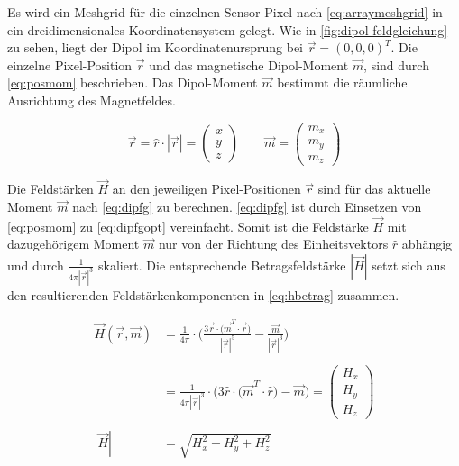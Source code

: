 \clearpage


Es wird ein Meshgrid für die einzelnen Sensor-Pixel nach \autoref{eq:arraymeshgrid} in ein dreidimensionales Koordinatensystem gelegt. Wie in \autoref{fig:dipol-feldgleichung} zu sehen, liegt der Dipol im Koordinatenursprung bei $\vec{r} = (0,0,0)^T$. Die einzelne Pixel-Position $\vec{r}$ und das magnetische Dipol-Moment $\vec{m}$, sind durch \autoref{eq:posmom} beschrieben. Das Dipol-Moment $\vec{m}$ bestimmt die räumliche Ausrichtung des Magnetfeldes.


\begin{equation}\label{eq:posmom}
\vec{r} = \hat{r} \cdot |\vec{r}| = \begin{pmatrix} x \\ y \\ z \end{pmatrix} \qquad \vec{m} = \begin{pmatrix} m_x \\ m_y \\ m_z \end{pmatrix}
\end{equation}


Die Feldstärken $\vec{H}$ an den jeweiligen Pixel-Positionen $\vec{r}$ sind für das aktuelle Moment $\vec{m}$ nach \autoref{eq:dipfg} zu berechnen. \autoref{eq:dipfg} ist durch Einsetzen von \autoref{eq:posmom} zu \autoref{eq:dipfgopt} vereinfacht. Somit ist die Feldstärke $\vec{H}$ mit dazugehörigem Moment $\vec{m}$ nur von der Richtung des Einheitsvektors $\hat{r}$ abhängig und durch $\frac{1}{4\pi|\vec{r}|^3}$ skaliert. Die entsprechende Betragsfeldstärke $|\vec{H}|$ setzt sich aus den resultierenden Feldstärkenkomponenten in \autoref{eq:hbetrag} zusammen.


\begin{align}
	\vec{H}(\vec{r},\vec{m}) &= \frac{1}{4\pi} \cdot \Bigg(\frac{3\vec{r} \cdot \big(\vec{m}^T \cdot \vec{r}\big)}{|\vec{r}|^5} - \frac{\vec{m}}{|\vec{r}|^3}\Bigg) \label{eq:dipfg} \\
							 \nonumber \\
							 &= \frac{1}{4\pi|\vec{r}|^3} \cdot \Big(3\hat{r} \cdot \big(\vec{m}^T \cdot \hat{r}\big) - \vec{m}\Big) = \begin{pmatrix} H_x \\ H_y \\ H_z \end{pmatrix} \label{eq:dipfgopt} \\
						     \nonumber \\
				   |\vec{H}| &= \sqrt{ H_x^2 + H_y^2 + H_z^2 } \label{eq:hbetrag}
\end{align}


